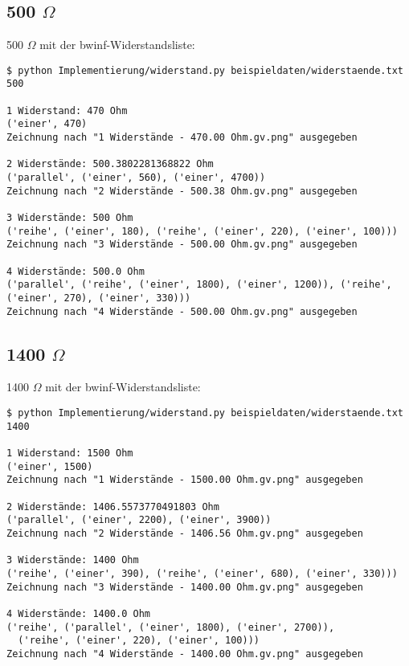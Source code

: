 \documentclass[a4paper,10pt,ngerman]{scrartcl}
\begin{document}
\subsection{500 $\Omega$}
500 $\Omega$ mit der bwinf-Widerstandsliste:

\begin{lstlisting}[breaklines=true]
$ python Implementierung/widerstand.py beispieldaten/widerstaende.txt 500

1 Widerstand: 470 Ohm
('einer', 470)
Zeichnung nach "1 Widerstände - 470.00 Ohm.gv.png" ausgegeben

2 Widerstände: 500.3802281368822 Ohm
('parallel', ('einer', 560), ('einer', 4700))
Zeichnung nach "2 Widerstände - 500.38 Ohm.gv.png" ausgegeben

3 Widerstände: 500 Ohm
('reihe', ('einer', 180), ('reihe', ('einer', 220), ('einer', 100)))
Zeichnung nach "3 Widerstände - 500.00 Ohm.gv.png" ausgegeben

4 Widerstände: 500.0 Ohm
('parallel', ('reihe', ('einer', 1800), ('einer', 1200)), ('reihe', ('einer', 270), ('einer', 330)))
Zeichnung nach "4 Widerstände - 500.00 Ohm.gv.png" ausgegeben
\end{lstlisting}


\subsection{1400 $\Omega$}
1400 $\Omega$ mit der bwinf-Widerstandsliste:

\begin{lstlisting}[breaklines=true]
$ python Implementierung/widerstand.py beispieldaten/widerstaende.txt 1400

1 Widerstand: 1500 Ohm
('einer', 1500)
Zeichnung nach "1 Widerstände - 1500.00 Ohm.gv.png" ausgegeben

2 Widerstände: 1406.5573770491803 Ohm
('parallel', ('einer', 2200), ('einer', 3900))
Zeichnung nach "2 Widerstände - 1406.56 Ohm.gv.png" ausgegeben

3 Widerstände: 1400 Ohm
('reihe', ('einer', 390), ('reihe', ('einer', 680), ('einer', 330)))
Zeichnung nach "3 Widerstände - 1400.00 Ohm.gv.png" ausgegeben

4 Widerstände: 1400.0 Ohm
('reihe', ('parallel', ('einer', 1800), ('einer', 2700)),
  ('reihe', ('einer', 220), ('einer', 100)))
Zeichnung nach "4 Widerstände - 1400.00 Ohm.gv.png" ausgegeben
\end{lstlisting}
\end{document}
